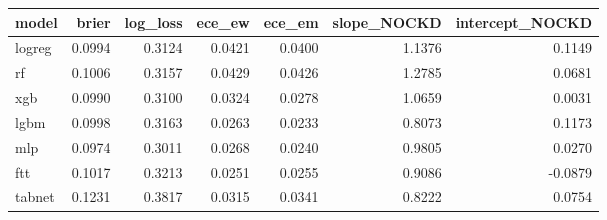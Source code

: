 \begin{tabular}{lrrrrrr}
\toprule
model & brier & log\_loss & ece\_ew & ece\_em & slope\_NOCKD & intercept\_NOCKD \\
\midrule
logreg & 0.0994 & 0.3124 & 0.0421 & 0.0400 & 1.1376 & 0.1149 \\
rf & 0.1006 & 0.3157 & 0.0429 & 0.0426 & 1.2785 & 0.0681 \\
xgb & 0.0990 & 0.3100 & 0.0324 & 0.0278 & 1.0659 & 0.0031 \\
lgbm & 0.0998 & 0.3163 & 0.0263 & 0.0233 & 0.8073 & 0.1173 \\
mlp & 0.0974 & 0.3011 & 0.0268 & 0.0240 & 0.9805 & 0.0270 \\
ftt & 0.1017 & 0.3213 & 0.0251 & 0.0255 & 0.9086 & -0.0879 \\
tabnet & 0.1231 & 0.3817 & 0.0315 & 0.0341 & 0.8222 & 0.0754 \\
\bottomrule
\end{tabular}
